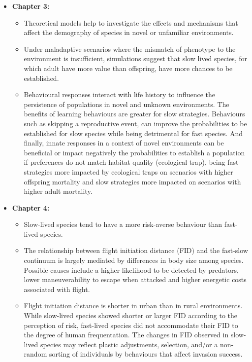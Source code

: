 \begin{itemize}
  \item \textbf{Chapter 3:}
  \begin{itemize}
    \item Theoretical models help to investigate the effects and mechanisms
that affect the demography of species in novel or unfamiliar environments.
    \item Under maladaptive scenarios where the mismatch of phenotype to the
environment is insufficient, simulations suggest that slow lived species,
for which adult have more value than offspring, have more chances to be
established.
    \item Behavioural responses interact with life history to influence the
persistence of populations in novel and unknown environments. The benefits of
learning behaviours are greater for slow strategies. Behaviours such
as skipping a reproductive event, can improve the probabilities to be
established for slow species while being detrimental for fast species. And
finally, innate responses in a context of novel environments can be beneficial
or impact negatively the probabilities to establish a population if preferences
do not match habitat quality (ecological trap), being fast strategies more
impacted by ecological traps on scenarios with higher offspring mortality and
slow strategies more impacted on scenarios with higher adult mortality.
  \end{itemize}


  \item \textbf{Chapter 4:}
  \begin{itemize}
    \item  Slow-lived species tend to have a more risk-averse behaviour than
fast-lived species.
    \item The relationship between flight initiation distance (FID) and the
fast-slow continuum is largely mediated by differences in body size among
species. Possible causes include a higher likelihood to be detected by
predators, lower maneuverability to escape when attacked and higher energetic
costs associated with flight.
    \item Flight initiation distance is shorter in urban than in rural
environments. While slow-lived species showed shorter or larger FID
according to the perception of risk, fast-lived species did not accommodate
their FID to the degree of human frequentation. The changes in FID observed in
slow-lived species may reflect plastic adjustments, selection, and/or a
non-random sorting of individuals by behaviours that affect invasion success.
  \end{itemize}



\end{itemize}
